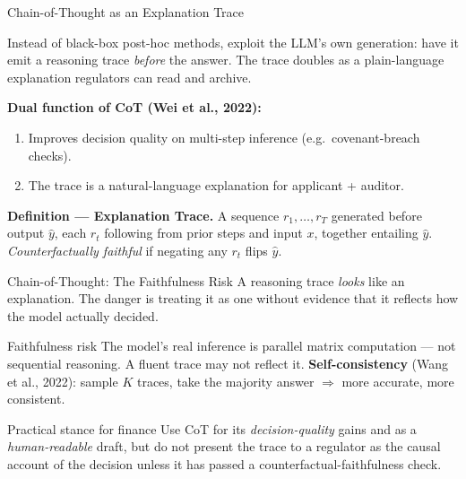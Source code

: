 \documentclass[9pt,t]{beamer}
\begin{document}
\begin{frame}{Chain-of-Thought as an Explanation Trace}
\begin{bigpicture}
Instead of black-box post-hoc methods, exploit the LLM's own generation: have it
emit a reasoning trace \emph{before} the answer. The trace doubles as a
plain-language explanation regulators can read and archive.
\end{bigpicture}

\textbf{Dual function of CoT (Wei et al., 2022):}
\begin{enumerate}\small
  \item Improves decision quality on multi-step inference (e.g.\ covenant-breach checks).
  \item The trace is a natural-language explanation for applicant + auditor.
\end{enumerate}

\begin{underhood}
\textbf{Definition --- Explanation Trace.} A sequence $r_1,\dots,r_T$ generated
before output $\hat{y}$, each $r_t$ following from prior steps and input $x$,
together entailing $\hat{y}$. \emph{Counterfactually faithful} if negating any
$r_t$ flips $\hat{y}$.
\end{underhood}
\end{frame}

\begin{frame}{Chain-of-Thought: The Faithfulness Risk}
A reasoning trace \emph{looks} like an explanation. The danger is treating it as
one without evidence that it reflects how the model actually decided.

\medskip
\begin{alertblock}{Faithfulness risk}
The model's real inference is parallel matrix computation --- not sequential
reasoning. A fluent trace may not reflect it. \textbf{Self-consistency} (Wang et
al., 2022): sample $K$ traces, take the majority answer $\Rightarrow$ more
accurate, more consistent.
\end{alertblock}

\medskip
\begin{block}{Practical stance for finance}
Use CoT for its \emph{decision-quality} gains and as a \emph{human-readable}
draft, but do not present the trace to a regulator as the causal account of the
decision unless it has passed a counterfactual-faithfulness check.
\end{block}
\end{frame}
\end{document}
